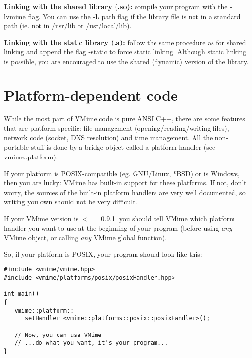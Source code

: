 {\bf Linking with the shared library (.so):} compile your program with the
{\vcode -lvmime} flag. You can use the -L path flag if the library file is
not in a standard path (ie. not in /usr/lib or /usr/local/lib).


{\bf Linking with the static library (.a):} follow the same procedure as for
shared linking and append the flag -static to force static linking. Although
static linking is possible, you are encouraged to use the shared (dynamic)
version of the library.


\section{Platform-dependent code}

While the most part of VMime code is pure ANSI C++, there are some features
that are platform-specific: file management (opening/reading/writing files),
network code (socket, DNS resolution) and time management. All the
non-portable stuff is done by a bridge object called a platform handler (see
{\vcode vmime::platform}).

If your platform is POSIX-compatible (eg. GNU/Linux, *BSD) or is Windows,
then you are lucky: VMime has built-in support for these platforms. If not,
don't worry, the sources of the built-in platform handlers are very well
documented, so writing you own should not be very difficult.

If your VMime version is $<=$ 0.9.1, you should tell VMime which platform
handler you want to use at the beginning of your program (before using
\emph{any} VMime object, or calling \emph{any} VMime global function).

So, if your platform is POSIX, your program should look like this:

\begin{lstlisting}[caption={Initializing VMime and the platform handler}]
#include <vmime/vmime.hpp>
#include <vmime/platforms/posix/posixHandler.hpp>

int main()
{
   vmime::platform::
      setHandler <vmime::platforms::posix::posixHandler>();

   // Now, you can use VMime
   // ...do what you want, it's your program...
}
\end{lstlisting}

